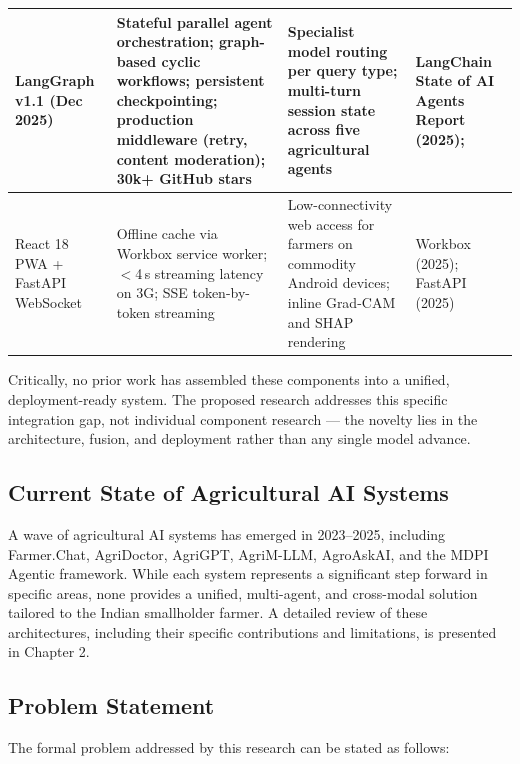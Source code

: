 \documentclass[12pt,a4paper]{article}
\begin{document}
\begin{longtable}{|p{2.8cm}|p{3.8cm}|p{3.8cm}|p{2.8cm}|}
LangGraph v1.1 (Dec 2025) &
Stateful parallel agent orchestration; graph-based cyclic workflows; persistent checkpointing; production middleware (retry, content moderation); 30k+ GitHub stars &
Specialist model routing per query type; multi-turn session state across five agricultural agents &
LangChain State of AI Agents Report (2025); \cite{langgraph2026} \\ \hline

React 18 PWA + FastAPI WebSocket &
Offline cache via Workbox service worker; $<$4\,s streaming latency on 3G; SSE token-by-token streaming &
Low-connectivity web access for farmers on commodity Android devices; inline Grad-CAM and SHAP rendering &
Workbox (2025); FastAPI (2025) \\ \hline
\end{longtable}

Critically, no prior work has assembled these components into a unified, deployment-ready system. The proposed research addresses this specific integration gap, not individual component research --- the novelty lies in the architecture, fusion, and deployment rather than any single model advance.

\subsection{Current State of Agricultural AI Systems}
A wave of agricultural AI systems has emerged in 2023--2025, including Farmer.\allowbreak Chat, AgriDoctor, AgriGPT, AgriM-LLM, AgroAskAI, and the MDPI Agentic framework. While each system represents a significant step forward in specific areas, none provides a unified, multi-agent, and cross-modal solution tailored to the Indian smallholder farmer. A detailed review of these architectures, including their specific contributions and limitations, is presented in Chapter 2.

\subsection{Problem Statement}
The formal problem addressed by this research can be stated as follows:
\end{document}
